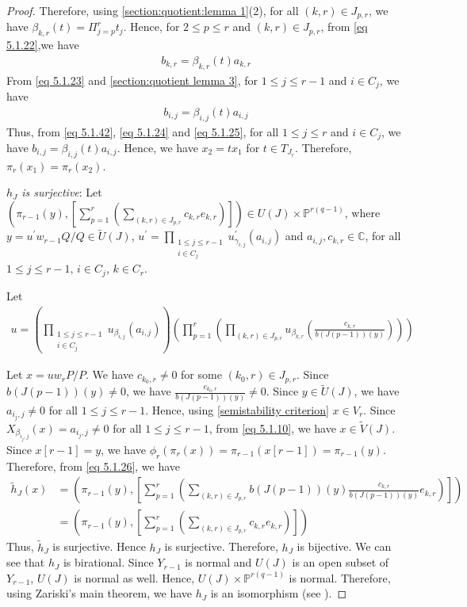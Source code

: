 \documentclass[12pt,reqno]{amsart}
\numberwithin{equation}{section}
\theoremstyle{definition}
\begin{document}
\begin{proof}
			
			Therefore, using \cref{section:quotient:lemma 1}(2), for all $(k,r)\in J_{p,r}$,  we have $\beta_{k,r}(t)=\Pi_{j=p}^{r}t_{j}$. Hence, for $2\leq p\leq r$ and $(k,r)\in J_{p,r}$, from \cref{eq 5.1.22},we have 
			\begin{align}\label{eq 5.1.24}
				b_{k,r}=\beta_{k,r}(t)a_{k,r}
			\end{align}
			From  \cref{eq 5.1.23} and \cref{section:quotient lemma 3}, for $1\leq j\leq r-1$ and $i\in C_{j}$, we have \begin{align}\label{eq 5.1.25}
				b_{i,j}=\beta_{i,j}(t)a_{i,j}
			\end{align}
			Thus, from \cref{eq 5.1.42}, \cref{eq 5.1.24} and \cref{eq 5.1.25}, for all $1\leq j\leq r$ and $i\in C_{j}$, we have $b_{i,j}=\beta_{i,j}(t)a_{i,j}$. Hence, we have
			$x_{2}=tx_{1}$ for $t\in T_{J_{r}}$. Therefore, $\pi_{r}(x_{1})=\pi_{r}(x_{2})$.
			
			{\it $h_{J}$ is surjective}: Let $(\pi_{r-1}(y),[\sum_{p=1}^{r}(\sum_{(k,r)\in J_{p,r}}c_{k,r}e_{k,r})])\in U(J)\times \mathbb{P}^{r(q-1)}$, where $y=u^{\prime}w_{r-1}Q/Q\in\tilde{U}(J)$, $u^{\prime}=\prod_{\substack{1\leq j\leq r-1\\i\in C_{j}}}u^{\prime}_{\gamma_{i,j}}(a_{i,j})$ and $a_{i,j},c_{k,r}\in\mathbb{C}$, for all $1\leq j\leq r-1$, $i\in C_{j}$, $k\in C_{r}$.
			
			Let \begin{align}\label{eq 5.1.34}
				u=(\displaystyle\prod_{\substack{1\leq j\leq r-1\\i\in C_{j}}}u_{\beta_{i,j}}(a_{i,j}))(\prod_{p=1}^{r}(\prod_{(k,r)\in J_{p,r}}u_{\beta_{k,r}}(\frac{c_{k,r}}{b(J(p-1))(y)})))
			\end{align}
			
			Let $x=uw_{r}P/P$. 
			We have $c_{k_{0},r}\neq 0$ for some $(k_{0},r)\in J_{p,r}$. Since $b(J(p-1))(y)\neq 0$, we have $\frac{c_{k_{0},r}}{b(J(p-1))(y)}\neq 0$. Since $y\in \tilde{U}(J)$, we have  $a_{i_{j},j}\neq 0$ for all $1\leq j\leq r-1$. Hence, using \cref{semistability criterion} $x\in V_{r}$. Since $X_{\beta_{i_{j},j}}(x)=a_{i_{j},j}\neq 0$ for all $1\leq j\leq r-1$, from \cref{eq 5.1.10}, we have $x\in \tilde{V}(J)$.\\
			Since $x[r-1]=y$, we have $\phi_{r}(\pi_{r}(x))=\pi_{r-1}(x[r-1])=\pi_{r-1}(y)$. Therefore, from \cref{eq 5.1.26}, we have%
			\begin{align*}
				\tilde{h}_{J}(x)&=(\pi_{r-1}(y),[\sum_{p=1}^{r}(\sum_{(k,r)\in J_{p,r}}b(J(p-1))(y)\frac{c_{k,r}}{b(J(p-1))(y)}e_{k,r})])\\
				&=(\pi_{r-1}(y),[\sum_{p=1}^{r}(\sum_{(k,r)\in J_{p,r}}c_{k,r}e_{k,r})])
			\end{align*}
			Thus, $\tilde{h}_{J}$ is surjective.  Hence $h_{J}$ is surjective. Therefore, $h_{J}$ is bijective. We can see that $h_{J}$ is birational.
			Since $Y_{r-1}$ is normal and $U(J)$ is an open subset of $Y_{r-1}$, $U(J)$ is normal as well. Hence, $U(J)\times\mathbb{P}^{r(q-1)}$ is normal. Therefore, using Zariski's main theorem, we have $h_{J}$ is an isomorphism (see \cite[Theorem 5.2.8]{springer}).
		\end{proof}		
\end{document}
